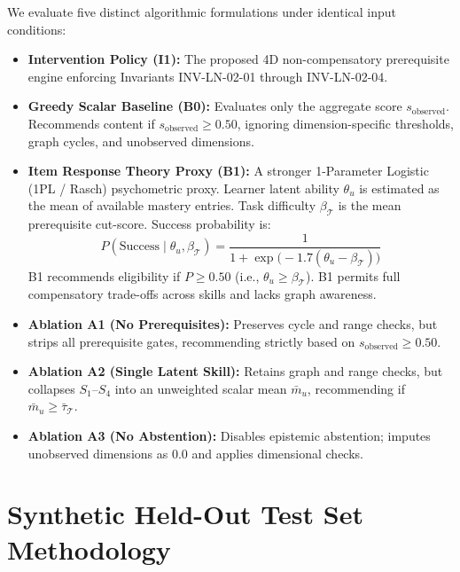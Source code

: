 \documentclass[11pt,a4paper]{article}
\begin{document}
We evaluate five distinct algorithmic formulations under identical input conditions:
\begin{itemize}[leftmargin=1.5em]
    \item \textbf{Intervention Policy (I1):} The proposed 4D non-compensatory prerequisite engine enforcing Invariants INV-LN-02-01 through INV-LN-02-04.
    \item \textbf{Greedy Scalar Baseline (B0):} Evaluates only the aggregate score $s_{\text{observed}}$. Recommends content if $s_{\text{observed}} \ge 0.50$, ignoring dimension-specific thresholds, graph cycles, and unobserved dimensions.
    \item \textbf{Item Response Theory Proxy (B1):} A stronger 1-Parameter Logistic (1PL / Rasch) psychometric proxy. Learner latent ability $\theta_u$ is estimated as the mean of available mastery entries. Task difficulty $\beta_{\mathcal{T}}$ is the mean prerequisite cut-score. Success probability is:
    \begin{equation}
        P(\text{Success} \mid \theta_u, \beta_{\mathcal{T}}) = \frac{1}{1 + \exp\big(-1.7(\theta_u - \beta_{\mathcal{T}})\big)}
    \end{equation}
    B1 recommends eligibility if $P \ge 0.50$ (i.e., $\theta_u \ge \beta_{\mathcal{T}}$). B1 permits full compensatory trade-offs across skills and lacks graph awareness.
    \item \textbf{Ablation A1 (No Prerequisites):} Preserves cycle and range checks, but strips all prerequisite gates, recommending strictly based on $s_{\text{observed}} \ge 0.50$.
    \item \textbf{Ablation A2 (Single Latent Skill):} Retains graph and range checks, but collapses $S_1$--$S_4$ into an unweighted scalar mean $\bar{m}_u$, recommending if $\bar{m}_u \ge \bar{\tau}_{\mathcal{T}}$.
    \item \textbf{Ablation A3 (No Abstention):} Disables epistemic abstention; imputes unobserved dimensions as $0.0$ and applies dimensional checks.
\end{itemize}

\section{Synthetic Held-Out Test Set Methodology}
\end{document}

